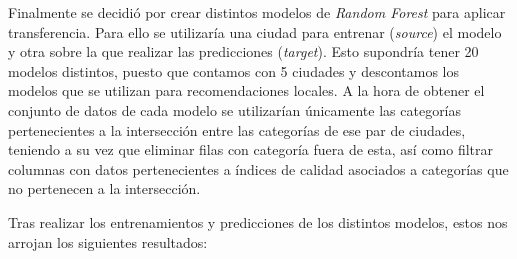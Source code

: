 
Finalmente se decidió por crear distintos modelos de \textit{Random Forest} para aplicar transferencia. Para ello se utilizaría una ciudad para entrenar (\textit{source}) el modelo y otra sobre la que realizar las predicciones (\textit{target}). Esto supondría tener 20 modelos distintos, puesto que contamos con 5 ciudades y descontamos los modelos que se utilizan para recomendaciones locales. A la hora de obtener el conjunto de datos de cada modelo se utilizarían únicamente las categorías pertenecientes a la intersección entre las categorías de ese par de ciudades, teniendo a su vez que eliminar filas con categoría fuera de esta, así como filtrar columnas con datos pertenecientes a índices de calidad asociados a categorías que no pertenecen a la intersección.

Tras realizar los entrenamientos y predicciones de los distintos modelos, estos nos arrojan los siguientes resultados:

